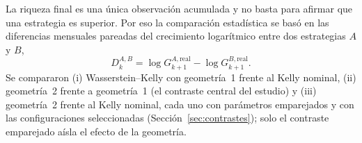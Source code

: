 La riqueza final es una única observación acumulada y no basta para afirmar que una estrategia es superior. Por eso la comparación estadística se basó en las diferencias mensuales pareadas del crecimiento logarítmico entre dos estrategias $A$ y $B$,
\begin{equation}\label{eq:D}
D^{A,B}_k=\log G^{A,\mathrm{real}}_{k+1}-\log G^{B,\mathrm{real}}_{k+1}.
\end{equation}
Se compararon (i) Wasserstein--Kelly con geometría~1 frente al Kelly nominal, (ii) geometría~2 frente a geometría~1 (el contraste central del estudio) y (iii) 
geometría~2 frente al Kelly nominal, cada uno con parámetros emparejados y con las configuraciones seleccionadas (Sección~\ref{sec:contrastes}); solo el contraste emparejado aísla el efecto de la geometría.

